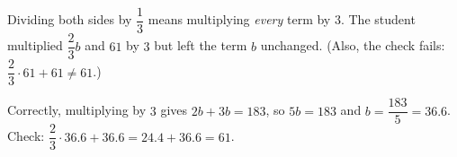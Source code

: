 Dividing both sides by $\dfrac{1}{3}$ means multiplying \emph{every} term by $3$. The student multiplied $\dfrac{2}{3}b$ and $61$ by $3$ but left the term $b$ unchanged. (Also, the check fails: $\dfrac{2}{3}\cdot61+61\ne61$.)

Correctly, multiplying by $3$ gives $2b+3b=183$, so $5b=183$ and $b=\boxed{\dfrac{183}{5}}=36.6$. Check: $\dfrac{2}{3}\cdot36.6+36.6=24.4+36.6=61$.
